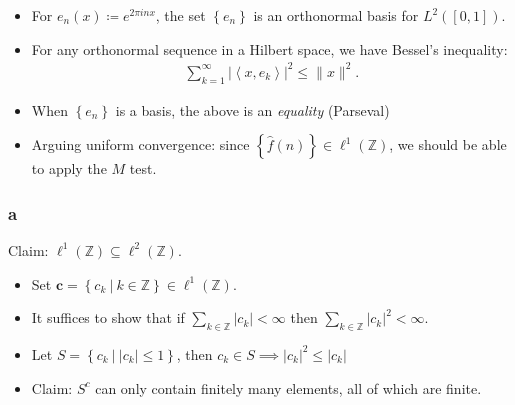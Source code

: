 \begin{solution}

\hfill

\begin{concept}

\hfill

\begin{itemize}
\tightlist
\item
  For \(e_n(x) \coloneqq e^{2\pi i n x}\), the set
  \(\left\{{e_n}\right\}\) is an orthonormal basis for \(L^2([0, 1])\).
\item
  For any orthonormal sequence in a Hilbert space, we have Bessel's
  inequality:
  \begin{align*}
  \sum_{k=1}^{\infty}\left|\left\langle x, e_{k}\right\rangle\right|^{2} \leq\|x\|^{2}
  .\end{align*}
\item
  When \(\left\{{e_n}\right\}\) is a basis, the above is an
  \emph{equality} (Parseval)
\item
  Arguing uniform convergence: since
  \(\left\{{\widehat{f}(n)}\right\} \in \ell^1({\mathbb{Z}})\), we
  should be able to apply the \(M\) test.
\end{itemize}

\end{concept}

\hypertarget{a-2}{%
\subsubsection{a}\label{a-2}}

Claim: \(\ell^1({\mathbb{Z}}) \subseteq \ell^2({\mathbb{Z}})\).

\begin{itemize}
\tightlist
\item
  Set
  \(\mathbf{c} = \left\{{c_k {~\mathrel{\Big|}~}k\in {\mathbb{Z}}}\right\} \in \ell^1({\mathbb{Z}})\).
\item
  It suffices to show that if
  \(\sum_{k\in {\mathbb{Z}}} {\left\lvert {c_k} \right\rvert} < \infty\)
  then
  \(\sum_{k\in {\mathbb{Z}}} {\left\lvert {c_k} \right\rvert}^2 < \infty\).
\item
  Let
  \(S = \left\{{c_k {~\mathrel{\Big|}~}{\left\lvert {c_k} \right\rvert} \leq 1}\right\}\),
  then
  \(c_k \in S \implies {\left\lvert {c_k} \right\rvert}^2 \leq {\left\lvert {c_k} \right\rvert}\)
\item
  Claim: \(S^c\) can only contain finitely many elements, all of which
  are finite.


\end{itemize}
\end{solution}

